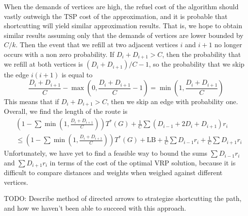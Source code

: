 \documentclass{article}
\theoremstyle{plain}
\theoremstyle{plain}
\begin{document}
When the demands of vertices are high, the refuel cost of the algorithm should vastly outweigh the TSP cost of the approximation, and it is probable that shortcutting will yield similar approximation results. That is, we hope to obtain similar results assuming only that the demands of vertices are lower bounded by $C/k$. Then the event that we refill at two adjacent vertices $i$ and $i+1$ no longer occurs with a non zero probability. If $D_i + D_{i+1} > C$, then the probability that we refill at both vertices is $(D_i + D_{i+1})/C - 1$, so the probability that we skip the edge $i(i+1)$ is equal to
%
\[ \frac{D_i + D_{i+1}}{C} - \max \left(0, \frac{D_i + D_{i+1}}{C} - 1 \right) = \min \left( 1, \frac{D_i + D_{i+1}}{C} \right) \]
%
This means that if $D_i + D_{i+1} > C$, then we skip an edge with probability one. Overall, we find the length of the route is
%
\begin{align*}
    &\left( 1 - \sum \min \left( 1, \frac{D_i + D_{i+1}}{C} \right) \right) T^*(G) + \frac{1}{C} \sum \left( D_{i-1} + 2D_i + D_{i+1} \right) r_i\\
    &\leq \left( 1 - \sum \min \left( 1, \frac{D_i + D_{i+1}}{C} \right) \right) T^*(G) + \text{LB} + \frac{1}{C} \sum D_{i-1} r_i + \frac{1}{C} \sum D_{i+1} r_i
\end{align*}
%
Unfortunately, we have yet to find a feasible way to bound the sums $\sum D_{i-1} r_i$ and $\sum D_{i+1} r_i$ in terms of the cost of the optimal VRP solution, because it is difficult to compare distances and weights when weighed against different vertices.

TODO: Describe method of directed arrows to strategize shortcutting the path, and how we haven't been able to succeed with this approach.







%
%
\end{document}
